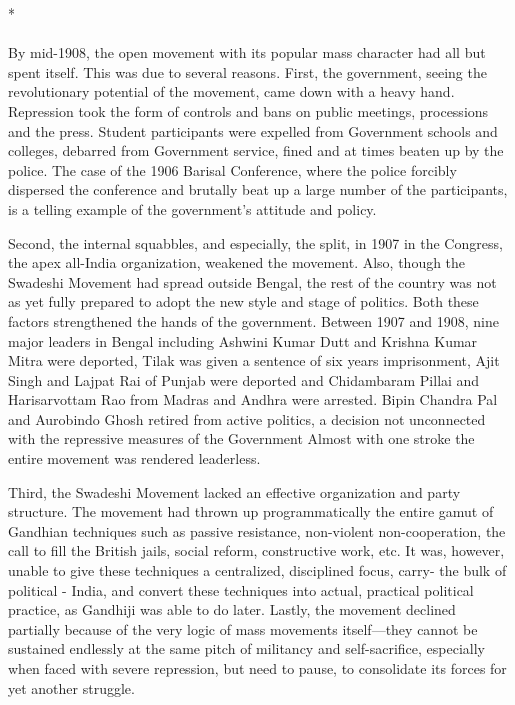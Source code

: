\begin{center}*\end{center}

\paragraph*{}


By mid-1908, the open movement with its popular mass character had all but spent itself. This was due to several reasons. First, the government, seeing the revolutionary potential of the movement, came down with a heavy hand. Repression took the form of controls and bans on public meetings, processions and the press. Student participants were expelled from Government schools and colleges, debarred from Government service, fined and at times beaten up by the police. The case of the 1906 Barisal Conference, where the police forcibly dispersed the conference and brutally beat up a large number of the participants, is a telling example of the government's attitude and policy.

Second, the internal squabbles, and especially, the split, in 1907 in the Congress, the apex all-India organization, weakened the movement. Also, though the Swadeshi Movement had spread outside Bengal, the rest of the country was not as yet fully prepared to adopt the new style and stage of politics. Both these factors strengthened the hands of the government. Between 1907 and 1908, nine major leaders in Bengal including Ashwini Kumar Dutt and Krishna Kumar Mitra were deported, Tilak was given a sentence of six years imprisonment, Ajit Singh and Lajpat Rai of Punjab were deported and Chidambaram Pillai and Harisarvottam Rao from Madras and Andhra were arrested. Bipin Chandra Pal and Aurobindo Ghosh retired from active politics, a decision not unconnected with the repressive measures of the Government Almost with one stroke the entire movement was rendered leaderless.

Third, the Swadeshi Movement lacked an effective organization and party structure. The movement had thrown up programmatically the entire gamut of Gandhian techniques such as passive resistance, non-violent non-cooperation, the call to fill the British jails, social reform, constructive work, etc. It was, however, unable to give these techniques a centralized, disciplined focus, carry- the bulk of political - India, and convert these techniques into actual, practical political practice, as Gandhiji was able to do later. Lastly, the movement declined partially because of the very logic of mass movements itself—they cannot be sustained endlessly at the same pitch of militancy and self-sacrifice, especially when faced with severe repression, but need to pause, to consolidate its forces for yet another struggle.

